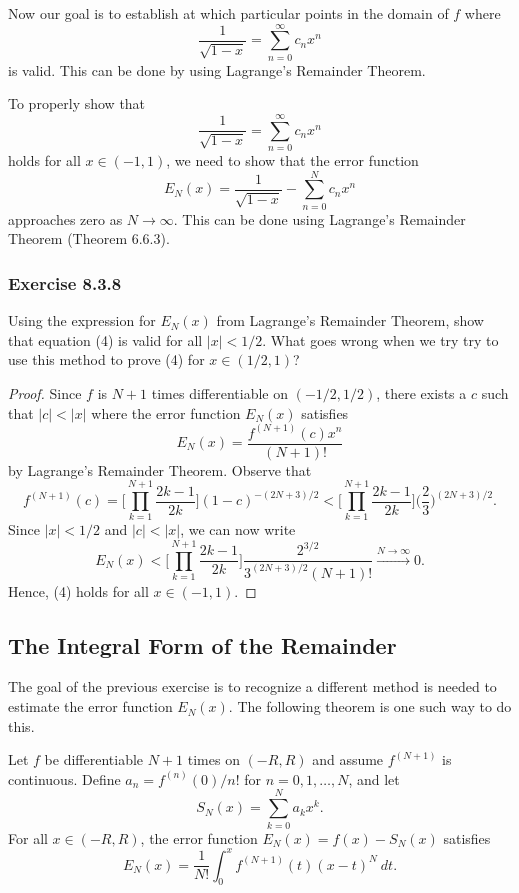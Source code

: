 Now our goal is to establish at which particular points in the domain of \( f  \) where 
\[  \frac{ 1 }{ \sqrt{ 1- x  }  }  = \sum_{ n=0 }^{ \infty  } c_{n} x^{n} \tag{4}  \] is valid. This can be done by using Lagrange's Remainder Theorem. 

To properly show that 
\[  \frac{ 1 }{ \sqrt{ 1-x  }  }  = \sum_{ n=0  }^{ \infty  } c_{n} x^{n}  \]
holds for all \( x \in (-1,1)  \), we need to show that the error function 
\[  E_{N}(x) = \frac{ 1 }{ \sqrt{ 1- x  }  }  - \sum_{ n=0  }^{ N  } c_{n } x^{ n} \]
approaches zero as \( N \to \infty  \). This can be done using Lagrange's Remainder Theorem (Theorem 6.6.3).


\subsubsection{Exercise 8.3.8} Using the expression for \( E_{N}(x)  \) from Lagrange's Remainder Theorem, show that equation (4) is valid for all \( | x  |  < 1 / 2  \). What goes wrong when we try try to use this method to prove (4) for \( x \in (1/2, 1 ) \)?
\begin{proof}
Since \( f  \) is \( N+1  \) times differentiable on \( (-1/2 , 1/ 2 ) \), there exists a \( c  \) such that \( |  c  |  < | x  |  \) where the error function \( E_{N}(x)  \) satisfies 
\[  E_{N}(x) = \frac{ f^{(N+1)}(c)  x^{n }  }{ (N+1)! } \] by Lagrange's Remainder Theorem. 
Observe that 
\[  f^{(N+1)}(c) = \Big[ \prod_{k=1}^{N+1} \frac{ 2k-1  }{ 2k }  \Big]   (1 -c )^{-(2N+3)/2} < \Big[ \prod_{k=1}^{N+1} \frac{ 2k-1  }{ 2k }  \Big]\Big( \frac{ 2 }{ 3 }  \Big)^{ (2N+3)/ 2}.\]
Since \( | x  |  < 1/ 2  \) and \( |  c  | < | x  |  \), we can now write
\[ E_{N}(x) < \Big[ \prod_{k=1}^{N+1} \frac{ 2k-1  }{ 2k }  \Big]\frac{  2^{3/2}}{  3^{(2N+3)/2} (N+1)! } \xrightarrow{N\rightarrow\infty} 0.   \]
Hence, (4) holds for all \( x \in (-1,1) \).
\end{proof}
\subsection{The Integral Form of the Remainder}

The goal of the previous exercise is to recognize a different method is needed to estimate the error function \( E_{N}(x)   \). The following theorem is one such way to do this.

\begin{tcolorbox}
    \begin{thm}
    Let \( f  \) be differentiable \( N+1  \) times on \( (-R,R ) \) and assume \( f^{(N+1)}  \) is continuous. Define \( a_{n} = f^{(n)} (0) / n !   \) for \( n = 0,1 , \dots , N  \), and let 
    \[  S_{N}(x) = \sum_{ k=0 }^{ N   } a_{k } x^{k }.  \] For all \( x \in (-R ,R ) \), the error function \( E_{N}(x) = f(x) - S_{N}(x)   \) satisfies 
    \[  E_{N}(x) = \frac{ 1 }{ N! } \int_{ 0 }^{ x  }  f^{(N+1) }(t) (x-t)^{N} \  dt.  \]
    \end{thm}
\end{tcolorbox}

